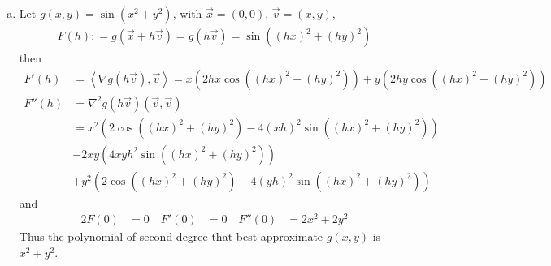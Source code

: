 \documentclass[a4paper,12pt]{article}
\theoremstyle{definition}
\begin{document}
\begin{enumerate}
\begin{enumerate}[(a)]


\item Let $g(x,y) = \sin (x^2+y^2)$, with $\vec{x} = (0,0)$, $\vec{v}=(x,y)$,
\begin{align*}
F(h): = g(\vec{x}+h\vec{v}) = g(h\vec{v}) = \sin ((hx)^2+(hy)^2)
\end{align*}
then
\begin{align*}
F'(h)&=\left\langle\nabla g(h\vec{v}),\vec{v}\right\rangle  = x (2hx\cos((hx)^2+(hy)^2)) + y (2hy\cos((hx)^2+(hy)^2))\\
F''(h)&=\nabla^2 g(h\vec{v})(\vec{v},\vec{v})\\
&=x^2(2\cos((hx)^2+(hy)^2)-4(xh)^2\sin((hx)^2+(hy)^2))\\
&-2xy(4xyh^2\sin((hx)^2+(hy)^2))\\
&+y^2(2\cos((hx)^2+(hy)^2)-4(yh)^2\sin((hx)^2+(hy)^2))
\end{align*}
and 
\begin{alignat*}{2}
F(0) &= 0 \quad F'(0) &= 0 \quad  F''(0) &= 2x^2 + 2y^2
\end{alignat*}
Thus the polynomial of second degree that best approximate $g(x,y)$ is $x^2+y^2$.	
\end{enumerate}




\end{enumerate}
\end{document}
